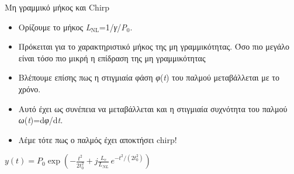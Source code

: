 \documentclass[11pt,aspectratio=169]{beamer}
\begin{document}
\begin{frame}[shrink=20,t]{Μη γραμμικό μήκος και Chirp}
\begin{itemize}
\item Ορίζουμε το μήκος \textit{L}$_{\text{NL}}$=1/\textit{γ}/\textit{P}$_{\text{0}}$.
\item Πρόκειται για το χαρακτηριστικό μήκος της μη γραμμικότητας. Όσο πιο μεγάλο είναι τόσο πιο μικρή η επίδραση της μη γραμμικότητας
\item Βλέπουμε επίσης πως η στιγμιαία φάση \textit{φ}(\textit{t}) του παλμού μεταβάλλεται με το χρόνο.
\item Αυτό έχει ως συνέπεια να μεταβάλλεται και η στιγμιαία συχνότητα του παλμού \textit{ω}(\textit{t})=d\textit{φ}/d\textit{t}\textit{.}
\item Λέμε τότε πως ο παλμός έχει αποκτήσει chirp!
\end{itemize}
\begin{center}
$\displaystyle y(t)=P_{0}\exp\left(-\frac{t^{2}}{2t_{0}^{2}}+j\frac{L_{e}}{L_{NL}}\,e^{-t^{2}/(2t_{0}^{2})}\right)$\\[0.6ex]
\end{center}
\end{frame}
\end{document}
